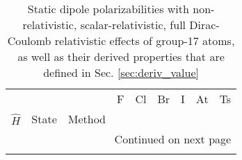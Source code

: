 \begin{longtable}{lllllllll}
\caption{Static dipole polarizabilities with non-relativistic, scalar-relativistic, full Dirac-Coulomb relativistic effects of group-17 atoms, as well as their derived properties that are defined in Sec. \ref{sec:deriv_value}}\label{tab:dipole_group_17}\\
\toprule
      &       &                                       &              F &            Cl &          Br &             I &          At &           Ts \\
$\hat{H}$ & State & Method &                &               &             &               &             &              \\
\midrule
\endhead
\midrule
\multicolumn{9}{r}{{Continued on next page}} \\
\midrule
\endfoot


\end{longtable}
